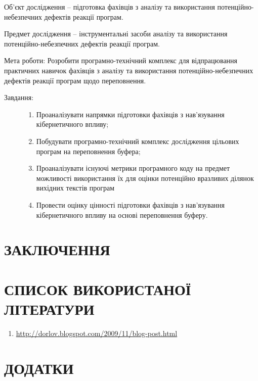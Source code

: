 \documentclass[oneside,final,14pt]{extreport}
\begin{document}
Об’єкт дослідження – підготовка фахівців з аналізу та використання потенційно-небезпечних дефектів реакції програм.

Предмет дослідження – інструментальні засоби  аналізу та використання потенційно-небезпечних дефектів реакції програм.

Мета роботи: Розробити програмно-технічний комплекс для відпрацювання практичних навичок фахівців з аналізу та використання потенційно-небезпечних дефектів реакції програм щодо переповнення.
\begin{description}
\item[{Завдання:}] \leavevmode\begin{enumerate}
\item {} 
Проаналізувати напрямки підготовки фахівців з нав’язування кібернетичного впливу;

\item {} 
Побудувати програмно-технічний комплекс дослідження цільових програм на переповнення буфера;

\item {} 
Проаналізувати існуючі метрики програмного коду на предмет можливості використання їх для оцінки потенційно вразливих ділянок вихідних текстів програм

\item {} 
Провести оцінку цінності підготовки фахівців з нав’язування кібернетичного впливу на основі переповнення буферу.
\end{enumerate}
\end{description}
\pagebreak









\chapter*{ЗАКЛЮЧЕННЯ}
\label{5decision::doc}\label{5decision:id1}

\pagebreak

\chapter*{СПИСОК ВИКОРИСТАНОЇ ЛІТЕРАТУРИ}
\label{6literature::doc}\label{6literature:id1}\begin{enumerate}
\item {} 
\href{http://dorlov.blogspot.com/2009/11/blog-post.html}{http://dorlov.blogspot.com/2009/11/blog-post.html}

\end{enumerate}

\pagebreak

\chapter*{ДОДАТКИ}
\label{7addition::doc}\label{7addition:id1}

\end{document}
